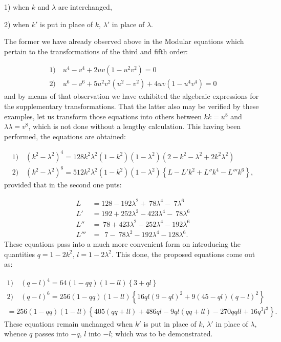 \documentclass{article}
\begin{document}
1) when $k$ and $\lambda$ are interchanged,

2) when $k'$ is put in place of $k$, $\lambda'$ in place of $\lambda$.

The former we have already observed above in the Modular equations which pertain to the transformations of the third and fifth order:

\[
\begin{gathered}
\text{1)}\quad u^{4}-v^{4}+2uv(1-u^{2}v^{2})=0\\
\text{2)}\quad u^{6}-v^{6}+5u^{2}v^{2}(u^{2}-v^{2})+4uv(1-u^{4}v^{4})=0
\end{gathered}
\]
and by means of that observation we have exhibited the algebraic expressions for the supplementary transformations. That the latter also may be verified by these examples, let us transform those equations into others between $kk=u^{8}$ and $\lambda\lambda=v^{8}$, which is not done without a lengthy calculation. This having been performed, the equations are obtained:

\[
\begin{gathered}
\text{1)}\quad(k^{2}-\lambda^{2})^{4}=128k^{2}\lambda^{2}(1-k^{2})(1-\lambda^{2})(2-k^{2}-\lambda^{2}+2k^{2}\lambda^{2})\\
\text{2)}\quad(k^{2}-\lambda^{2})^{6}=512k^{2}\lambda^{2}(1-k^{2})(1-\lambda^{2})\left\{L-L'k^{2}+L''k^{4}-L'''k^{6}\right\},
\end{gathered}
\]
provided that in the second one puts:

\[
\begin{aligned}
L&=128-192\lambda^{2}+\ 78\lambda^{4}-\ 7\lambda^{6}\\
L'&=192+252\lambda^{2}-423\lambda^{4}-\ 78\lambda^{6}\\
L''&=\ 78+423\lambda^{2}-252\lambda^{4}-192\lambda^{6}\\
L'''&=\ \ 7-\ 78\lambda^{2}-192\lambda^{4}-128\lambda^{6}.
\end{aligned}
\]
These equations pass into a much more convenient form on introducing the quantities $q=1-2k^{2}$, $l=1-2\lambda^{2}$. This done, the proposed equations come out as:

\[
\begin{gathered}
\text{1)}\quad(q-l)^{4}=64(1-qq)(1-ll)\left\{3+ql\right\}\\[1ex]
\text{2)}\quad(q-l)^{6}=256(1-qq)(1-ll)\left\{16ql(9-ql)^{2}+9(45-ql)(q-l)^{2}\right\}\\
=256(1-qq)(1-ll)\left\{405(qq+ll)+486ql-9ql(qq+ll)-270qqll+16q^{3}l^{3}\right\}.
\end{gathered}
\]
These equations remain unchanged when $k'$ is put in place of $k$, $\lambda'$ in place of $\lambda$, whence $q$ passes into $-q$, $l$ into $-l$; which was to be demonstrated.
\end{document}
